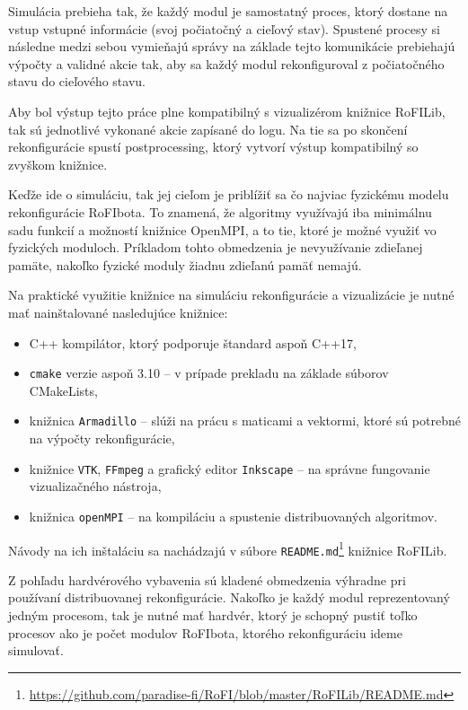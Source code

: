 \documentclass[
  digital, %
  oneside, %
  table,   %
  lof,     %
  nolot,     %
]{fithesis3}
\begin{document}
Simulácia prebieha tak, že každý modul je samostatný proces, ktorý dostane na vstup vstupné informácie (svoj počiatočný a cieľový stav). Spustené procesy si následne medzi sebou vymieňajú správy na základe tejto komunikácie prebiehajú výpočty a validné akcie tak, aby sa každý modul rekonfiguroval z počiatočného stavu do cieľového stavu. 

Aby bol výstup tejto práce plne kompatibilný s vizualizérom knižnice RoFILib, tak sú jednotlivé vykonané akcie zapísané do logu. Na tie sa po skončení rekonfigurácie spustí postprocessing, ktorý vytvorí výstup kompatibilný so zvyškom knižnice. 

Keďže ide o simuláciu, tak jej cieľom je priblížiť sa čo najviac fyzickému modelu rekonfigurácie RoFIbota. To znamená, že algoritmy využívajú iba minimálnu sadu funkcií a možností knižnice OpenMPI, a to tie, ktoré je možné využiť vo fyzických moduloch. Príkladom tohto obmedzenia je nevyužívanie zdieľanej pamäte, nakoľko fyzické moduly žiadnu zdieľanú pamäť nemajú. 

Na praktické využitie knižnice na simuláciu rekonfigurácie a vizualizácie je nutné mať nainštalované nasledujúce knižnice: 
\begin{itemize}
    \item C++ kompilátor, ktorý podporuje štandard aspoň C++17, 
    \item \texttt{cmake} verzie aspoň 3.10 -- v prípade prekladu na základe súborov CMakeLists, 
    \item knižnica \texttt{Armadillo} -- slúži na prácu s maticami a vektormi, ktoré sú potrebné na výpočty rekonfigurácie,  
    \item knižnice \texttt{VTK}, \texttt{FFmpeg} a grafický editor \texttt{Inkscape} -- na správne fungovanie vizualizačného nástroja, 
    \item knižnica \texttt{openMPI} -- na kompiláciu a spustenie distribuovaných algoritmov. 
\end{itemize}

 Návody na ich inštaláciu sa nachádzajú v súbore \texttt{README.md}\footnote{\url{https://github.com/paradise-fi/RoFI/blob/master/RoFILib/README.md}} knižnice RoFILib. 

Z pohľadu hardvérového vybavenia sú kladené obmedzenia výhradne pri používaní distribuovanej rekonfigurácie. Nakoľko je každý modul reprezentovaný jedným procesom, tak je nutné mať hardvér, ktorý je schopný pustiť toľko procesov ako je počet modulov RoFIbota, ktorého rekonfiguráciu ideme simulovať. 
\end{document}
